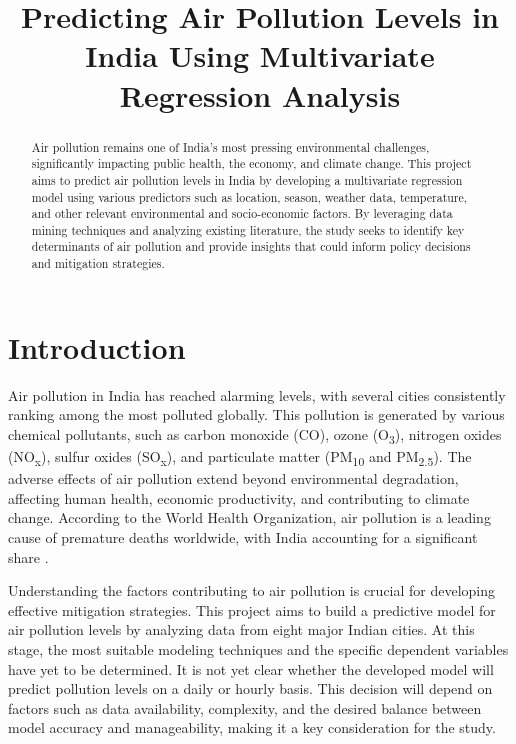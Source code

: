 \documentclass[12pt]{article}
\title{Predicting Air Pollution Levels in India Using Multivariate Regression Analysis}
\author{}
\date{}
\begin{document}
\maketitle


\begin{abstract}
Air pollution remains one of India's most pressing environmental challenges, significantly impacting public health, the economy, and climate change. This project aims to predict air pollution levels in India by developing a multivariate regression model using various predictors such as location, season, weather data, temperature, and other relevant environmental and socio-economic factors. By leveraging data mining techniques and analyzing existing literature, the study seeks to identify key determinants of air pollution and provide insights that could inform policy decisions and mitigation strategies.
\end{abstract}

\tableofcontents

\newpage

\section{Introduction}

Air pollution in India has reached alarming levels, with several cities consistently ranking among the most polluted globally. This pollution is generated by various chemical pollutants, such as carbon monoxide (CO), ozone (O\textsubscript{3}), nitrogen oxides (NO\textsubscript{x}), sulfur oxides (SO\textsubscript{x}), and particulate matter (PM\textsubscript{10} and PM\textsubscript{2.5}). The adverse effects of air pollution extend beyond environmental degradation, affecting human health, economic productivity, and contributing to climate change. According to the World Health Organization, air pollution is a leading cause of premature deaths worldwide, with India accounting for a significant share \cite{Dey2020}.

Understanding the factors contributing to air pollution is crucial for developing effective mitigation strategies. This project aims to build a predictive model for air pollution levels by analyzing data from eight major Indian cities. At this stage, the most suitable modeling techniques and the specific dependent variables have yet to be determined. It is not yet clear whether the developed model will predict pollution levels on a daily or hourly basis. This decision will depend on factors such as data availability, complexity, and the desired balance between model accuracy and manageability, making it a key consideration for the study.
\end{document}
